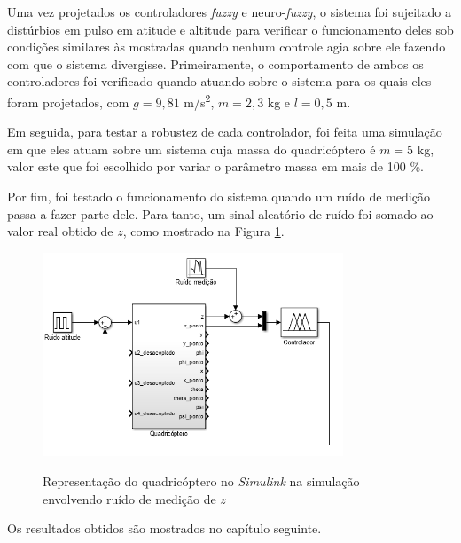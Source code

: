 Uma vez projetados os controladores \textit{fuzzy} e neuro-\textit{fuzzy}, o sistema foi sujeitado a distúrbios em pulso em atitude e altitude para verificar o funcionamento deles sob condições similares às mostradas quando nenhum controle agia sobre ele fazendo com que o sistema divergisse. Primeiramente, o comportamento de ambos os controladores foi verificado quando atuando sobre o sistema para os quais eles foram projetados, com $g=9,81$ m/s\textsuperscript{2}, $m=2,3$ kg e $l=0,5$ m. 

Em seguida, para testar a robustez de cada controlador, foi feita uma simulação em que eles atuam sobre um sistema cuja massa do quadricóptero é $m=5$ kg, valor este que foi escolhido por variar o parâmetro massa em mais de 100 \%.

Por fim, foi testado o funcionamento do sistema quando um ruído de medição passa a fazer parte dele. Para tanto, um sinal aleatório de ruído foi somado ao valor real obtido de $z$, como mostrado na Figura \ref{fig:diagrama_sistema_com_ruido}.

\begin{figure}[!htb]
    \centering
    \caption{Representação do quadricóptero no \textit{Simulink} na simulação envolvendo ruído de medição de $z$}
    \includegraphics[width=0.8\textwidth]{./04-figuras/figuras_pos_banca/7-altitude2kg_ruido/diagrama_sistema_com_ruido}
    \label{fig:diagrama_sistema_com_ruido}
\end{figure}

Os resultados obtidos são mostrados no capítulo seguinte.